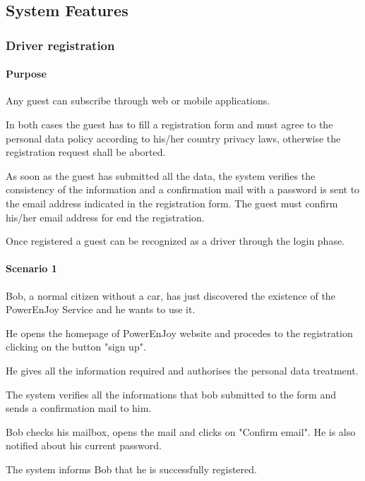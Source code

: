 \subsection{System Features}

\subsubsection{Driver registration}

\paragraph{Purpose}
Any guest can subscribe through web or mobile applications.

In both cases the guest has to fill a registration form and must agree to the personal data policy according to his/her country privacy laws, otherwise the registration request shall be aborted.

As soon as the guest has submitted all the data, the system verifies the consistency of the information and a confirmation mail with a password is sent to the email address indicated in the registration form. The guest 
must confirm his/her email address for end the registration.

Once registered a guest can be recognized as a driver through the login phase.

\paragraph{Scenario 1}
Bob, a normal citizen without a car, has just discovered the existence of the PowerEnJoy Service and he wants to use it.

He opens the homepage of PowerEnJoy website and procedes to the registration clicking on the button "sign up".

He gives all the information required and authorises the personal data treatment. 

The system verifies all the informations that bob submitted to the form and sends a confirmation mail to him.

Bob checks his mailbox, opens the mail and clicks on "Confirm email". He is also notified about his current password.

The system informs Bob that he is successfully registered.

